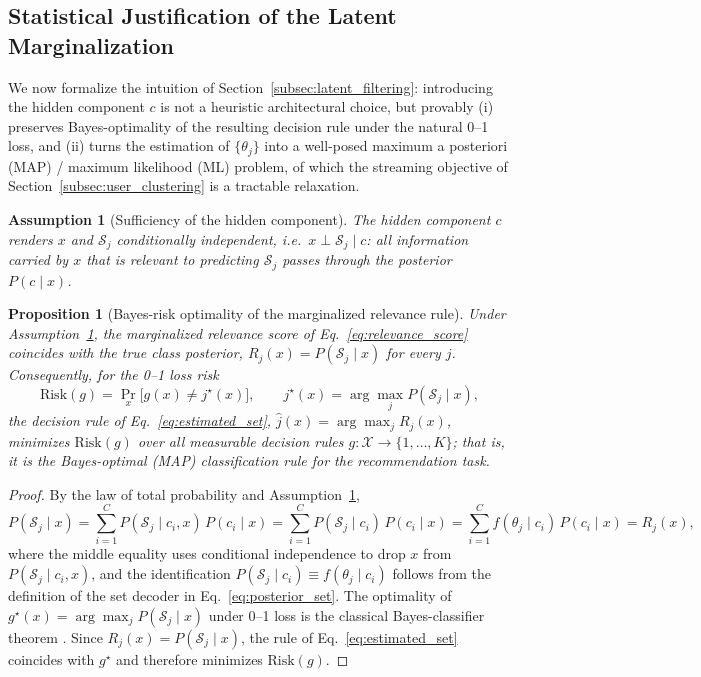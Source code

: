 \documentclass{article}
\theoremstyle{plain}
\newtheorem{proposition}{Proposition}
\newtheorem{assumption}{Assumption}
\theoremstyle{definition}
\theoremstyle{remark}
\begin{document}
\subsection{Statistical Justification of the Latent Marginalization}
\label{subsec:theory_general}

We now formalize the intuition of Section~\ref{subsec:latent_filtering}: introducing the hidden component $c$ is not a heuristic architectural choice, but provably (i) preserves Bayes-optimality of the resulting decision rule under the natural 0--1 loss, and (ii) turns the estimation of $\{\theta_j\}$ into a well-posed maximum a posteriori (MAP) / maximum likelihood (ML) problem, of which the streaming objective of Section~\ref{subsec:user_clustering} is a tractable relaxation.

\begin{assumption}[Sufficiency of the hidden component]
	\label{ass:sufficiency}
	The hidden component $c$ renders $x$ and $\mathcal{S}_j$ conditionally independent, i.e.\ $x \perp \mathcal{S}_j \mid c$: all information carried by $x$ that is relevant to predicting $\mathcal{S}_j$ passes through the posterior $P(c \mid x)$.
\end{assumption}

\begin{proposition}[Bayes-risk optimality of the marginalized relevance rule]
	\label{prop:bayes_optimal}
	Under Assumption~\ref{ass:sufficiency}, the marginalized relevance score of Eq.~\eqref{eq:relevance_score} coincides with the true class posterior, $R_j(x) = P(\mathcal{S}_j \mid x)$ for every $j$. Consequently, for the 0--1 loss risk
	\[
	\mathrm{Risk}(g) = \Pr_{x}\big[g(x) \neq j^\star(x)\big], \qquad j^\star(x) = \arg\max_j P(\mathcal S_j \mid x),
	\]
	the decision rule of Eq.~\eqref{eq:estimated_set}, $\widehat{j}(x) = \arg\max_j R_j(x)$, minimizes $\mathrm{Risk}(g)$ over all measurable decision rules $g:\mathcal X \to \{1,\dots,K\}$; that is, it is the Bayes-optimal (MAP) classification rule for the recommendation task.
\end{proposition}

\begin{proof}
	By the law of total probability and Assumption~\ref{ass:sufficiency},
	\[
	P(\mathcal{S}_j \mid x) = \sum_{i=1}^{C} P(\mathcal{S}_j \mid c_i, x)\,P(c_i \mid x) = \sum_{i=1}^{C} P(\mathcal{S}_j \mid c_i)\,P(c_i \mid x) = \sum_{i=1}^{C} f(\theta_j \mid c_i)\,P(c_i \mid x) = R_j(x),
	\]
	where the middle equality uses conditional independence to drop $x$ from $P(\mathcal S_j\mid c_i,x)$, and the identification $P(\mathcal S_j\mid c_i)\equiv f(\theta_j\mid c_i)$ follows from the definition of the set decoder in Eq.~\eqref{eq:posterior_set}. The optimality of $g^\star(x)=\arg\max_j P(\mathcal S_j\mid x)$ under 0--1 loss is the classical Bayes-classifier theorem \citep[Ch.~2]{devroye1996probabilistic}. Since $R_j(x)=P(\mathcal S_j\mid x)$, the rule of Eq.~\eqref{eq:estimated_set} coincides with $g^\star$ and therefore minimizes $\mathrm{Risk}(g)$.
\end{proof}
\end{document}
